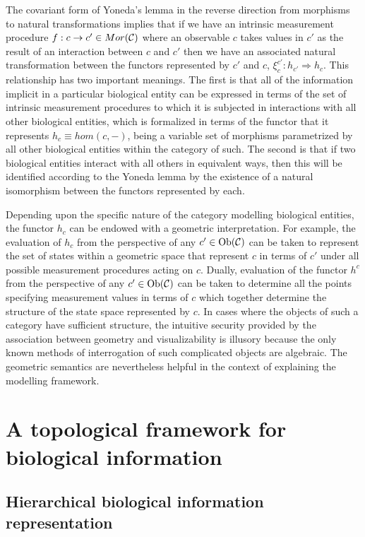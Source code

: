 \documentclass[aps,twocolumn]{revtex4-1}
\begin{document}
The covariant form of Yoneda's lemma in the reverse direction from morphisms to natural transformations implies that if we have an intrinsic measurement procedure $f:c \rightarrow c' \in Mor({\mathcal C})$  where an observable $c$ takes values in $c'$ as the result of an interaction between $c$ and $c'$ then we have an associated natural transformation between the functors represented by $c'$ and $c$, $\xi^{c'}_{c} : h_{c'} \Rightarrow h_c$. 
This relationship has two important meanings. The first is that all of the information implicit in a particular biological entity can be expressed in terms of the set of intrinsic measurement procedures to which it is subjected in interactions with all other biological entities, which is formalized in terms of the functor that it represents $h_c \equiv hom(c,-)$, being a variable set of morphisms parametrized by all other biological entities within the category of such. The second is that if two biological entities interact with all others in equivalent ways, then this will be identified according to the Yoneda lemma by the existence of a natural isomorphism between the functors represented by each.

Depending upon the specific nature of the category modelling biological entities, the functor $h_c$ can be endowed with a geometric interpretation. For example, the evaluation of $h_c$ from the perspective of any $c' \in \mathop{\rm Ob}\nolimits({\mathcal C})$ can be taken to represent the set of states within a geometric space that represent $c$ in terms of $c'$ under all possible measurement procedures acting on $c$. Dually, evaluation of the functor $h^c$ from the perspective of any $c' \in \mathop{\rm Ob}\nolimits({\mathcal C})$ can be taken to determine all the points specifying measurement values in terms of $c$ which together determine the structure of the state space represented by $c$. In cases where the objects of such a category have sufficient structure, the intuitive security provided by the association between geometry and visualizability is illusory because the only known methods of interrogation of such complicated objects are algebraic. The geometric semantics are nevertheless helpful in the context of explaining the modelling framework.

\section{A topological framework for biological information}

\subsection{Hierarchical biological information representation}
\end{document}
